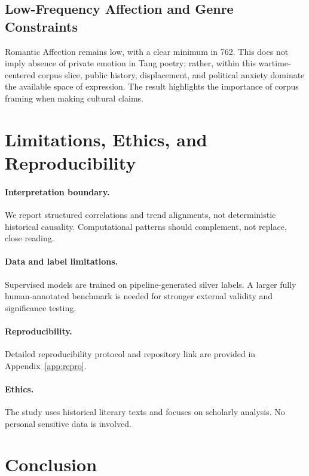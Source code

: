 \documentclass[11pt]{article}
\begin{document}
\subsection{Low-Frequency Affection and Genre Constraints}

Romantic Affection remains low, with a clear minimum in 762.
This does not imply absence of private emotion in Tang poetry; rather, within this wartime-centered corpus slice, public history, displacement, and political anxiety dominate the available space of expression.
The result highlights the importance of corpus framing when making cultural claims.

\section{Limitations, Ethics, and Reproducibility}

\paragraph{Interpretation boundary.}
We report structured correlations and trend alignments, not deterministic historical causality.
Computational patterns should complement, not replace, close reading.

\paragraph{Data and label limitations.}
Supervised models are trained on pipeline-generated silver labels.
A larger fully human-annotated benchmark is needed for stronger external validity and significance testing.

\paragraph{Reproducibility.}
Detailed reproducibility protocol and repository link are provided in Appendix~\ref{app:repro}.

\paragraph{Ethics.}
The study uses historical literary texts and focuses on scholarly analysis.
No personal sensitive data is involved.

\section{Conclusion}
\end{document}
